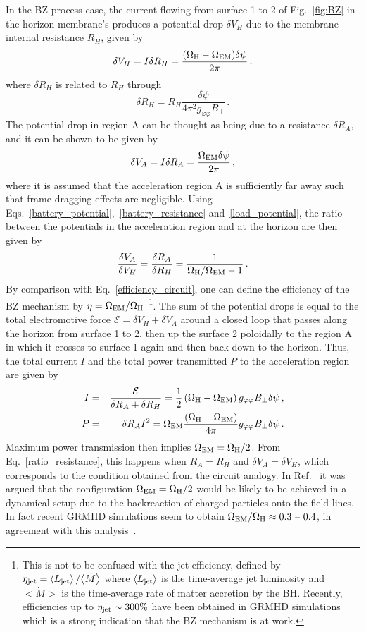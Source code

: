 \documentclass[11pt]{article}
\newcommand{\be}{\begin{equation}}
\newcommand{\ee}{\end{equation}}
\def\beq{\begin{eqnarray}}
\def\eeq{\end{eqnarray}}
\numberwithin{equation}{section} %
\begin{document}
In the BZ process case, the current flowing from surface 1 to 2 of Fig.~\ref{fig:BZ} in the horizon membrane's produces 
a potential drop $\delta V_H$ due to the membrane internal resistance $R_H$, given by~\cite{MacDonald:1982zz}
%
\be\label{battery_potential}
\delta V_H=I \delta R_H=\frac{(\Omega_{\rm H}-\Omega_{\rm EM})\delta\psi}{2\pi}\,.
\ee
%
where $\delta R_H$ is related to $R_H$ through~\cite{MacDonald:1982zz}
%
\be\label{battery_resistance}
\delta R_H=R_H\frac{\delta\psi}{4\pi^2 g_{\varphi\varphi} B_{\bot}}\,.
\ee
%
The potential drop in region A can be thought as being due to a resistance $\delta R_A$, and it can be shown to be given 
by~\cite{MacDonald:1982zz}
%
\be\label{load_potential}
\delta V_A=I \delta R_A=\frac{\Omega_{\rm EM}\delta\psi}{2\pi}\,,
\ee
%
where it is assumed that the acceleration region A is sufficiently far away such that frame dragging effects are 
negligible.
Using Eqs.~\eqref{battery_potential},~\eqref{battery_resistance} and~\eqref{load_potential}, the ratio between the 
potentials in the acceleration region and at the horizon are then given by
%
\be\label{ratio_resistance}
\frac{\delta V_A}{\delta V_H}=\frac{\delta R_A}{\delta R_H}=\frac{1}{\Omega_{\rm H}/\Omega_{\rm EM}-1}\,.
\ee
%
By comparison with Eq.~\eqref{efficiency_circuit}, one can define the efficiency of the BZ mechanism by 
$\eta=\Omega_{\rm EM}/\Omega_{\rm H}$~\cite{Blandford:1977ds}\footnote{This is not to be confused with the jet 
efficiency, defined by $\eta_{\rm jet}=\left<L_{\rm jet}\right>/\big<\dot{M}\big>$ where $\left<L_{\rm jet}\right>$ is 
the time-average jet luminosity and $\big<\dot{M}\big>$ is the time-average rate of matter accretion by the BH. 
Recently, efficiencies up to $\eta_{\rm jet}\sim 300\%$ have been obtained in GRMHD 
simulations~\cite{Tchekhovskoy:2011zx,Tchekhovskoy:2012up,McKinney:2012vh,Lasota:2013kia} which is a strong indication 
that the BZ mechanism is at work.}.
The sum of the potential drops is equal to the total electromotive force $\mathcal{E}=\delta V_H+\delta V_A$ around a 
closed loop that passes along the horizon from surface 1 to 2, then up the surface 2 poloidally to the region A in which 
it crosses to surface 1 again and then back down to the horizon. Thus, the total current $I$ and the total power 
transmitted $P$ to the acceleration region are given by
%
\beq
I&=&\frac{\mathcal{E}}{\delta R_A+\delta R_H}=\frac{1}{2}\left(\Omega_{\rm H}-\Omega_{\rm 
EM}\right)g_{\varphi\varphi}B_{\bot}\delta \psi\,,\\
P&=&\delta R_A I^2=\Omega_{\rm EM}\frac{\left(\Omega_{\rm H}-\Omega_{\rm 
EM}\right)}{4\pi}g_{\varphi\varphi}B_{\bot}\delta \psi\,.
\eeq
%
Maximum power transmission then implies $\Omega_{\rm EM}=\Omega_{\rm H}/2$. From Eq.~\eqref{ratio_resistance}, this 
happens when $R_A=R_H$ and $\delta V_A=\delta V_H$, which corresponds to the condition obtained from the circuit 
analogy. In Ref.~\cite{MacDonald:1982zz} it was argued that the configuration $\Omega_{\rm EM}=\Omega_{\rm H}/2$ would 
be likely to be achieved in a dynamical setup due to the backreaction of charged particles onto the field lines. In fact 
recent GRMHD simulations seem to obtain $\Omega_{\rm EM}/\Omega_{\rm H}\approx 0.3\text{ -- }0.4$, in agreement with 
this analysis~\cite{McKinney:2012vh,Penna:2013rga}.
  	
\end{document}
